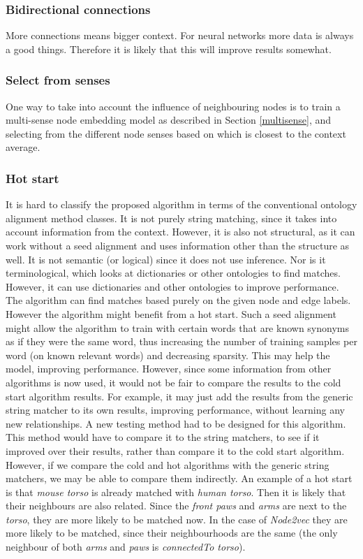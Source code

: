 \documentclass{article}
\begin{document}
  \subsubsection{Bidirectional connections}
  More connections means bigger context. For neural networks more data is always a good things. Therefore it is likely that this will improve results somewhat.
  \subsubsection{Select from senses}
  One way to take into account the influence of neighbouring nodes is to train a multi-sense node embedding model as described in Section \ref{multisense}, and selecting from the different node senses based on which is closest to the context average.
  \subsubsection{Hot start}
  It is hard to classify the proposed algorithm in terms of the conventional ontology alignment method classes. It is not purely string matching, since it takes into account information from the context. However, it is also not structural, as it can work without a seed alignment and uses information other than the structure as well. It is not semantic (or logical) since it does not use inference. Nor is it terminological, which looks at dictionaries or other ontologies to find matches. However, it can use dictionaries and other ontologies to improve performance.
  The algorithm can find matches based purely on the given node and edge labels. However the algorithm might benefit from a hot start. Such a seed alignment might allow the algorithm to train with certain words that are known synonyms as if they were the same word, thus increasing the number of training samples per word (on known relevant words) and decreasing sparsity. This may help the model, improving performance. However, since some information from other algorithms is now used, it would not be fair to compare the results to the cold start algorithm results. For example, it may just add the results from the generic string matcher to its own results, improving performance, without learning any new relationships. A new testing method had to be designed for this algorithm. This method would have to compare it to the string matchers, to see if it improved over their results, rather than compare it to the cold start algorithm. However, if we compare the cold and hot algorithms with the generic string matchers, we may be able to compare them indirectly.
  An example of a hot start is that \emph{mouse torso} is already matched with \emph{human torso}. Then it is likely that their neighbours are also related. Since the \emph{front paws} and \emph{arms} are next to the \emph{torso}, they are more likely to be matched now. In the case of \emph{Node2vec} they are more likely to be matched, since their neighbourhoods are the same (the only neighbour of both \emph{arms} and \emph{paws} is \emph{connectedTo torso}).
\end{document}

